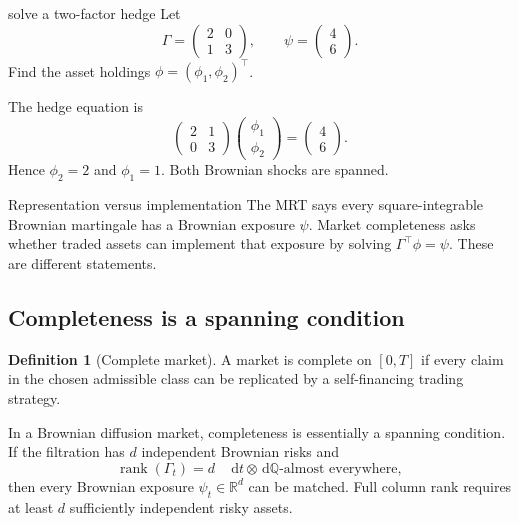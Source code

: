 \documentclass[10pt]{article}
\newcommand{\Q}{\mathbb Q}
\newcommand{\R}{\mathbb R}
\newcommand{\1}{\mathbf 1}
\newcommand{\dd}{\,\mathrm d}
\DeclareMathOperator{\rank}{rank}
\theoremstyle{definition}
\newtheorem{definition}{Definition}[section]
\begin{document}
\begin{studentexercise}{solve a two-factor hedge}
Let
\[
\Gamma=
\begin{pmatrix}
2&0\\
1&3
\end{pmatrix},
\qquad
\psi=
\begin{pmatrix}
4\\6
\end{pmatrix}.
\]
Find the asset holdings \(\phi=(\phi_1,\phi_2)^\top\).
\end{studentexercise}
\begin{shortsolution}
The hedge equation is
\[
\begin{pmatrix}2&1\\0&3\end{pmatrix}
\begin{pmatrix}\phi_1\\\phi_2\end{pmatrix}
=
\begin{pmatrix}4\\6\end{pmatrix}.
\]
Hence \(\phi_2=2\) and \(\phi_1=1\). Both Brownian shocks are spanned.
\end{shortsolution}

\begin{keyidea}{Representation versus implementation}
The MRT says every square-integrable Brownian martingale has a Brownian
exposure \(\psi\). Market completeness asks whether traded assets can
implement that exposure by solving \(\Gamma^\top\phi=\psi\). These are
different statements.
\end{keyidea}

\subsection{Completeness is a spanning condition}

\begin{definition}[Complete market]
A market is complete on \([0,T]\) if every claim in the chosen admissible
class can be replicated by a self-financing trading strategy.
\end{definition}

In a Brownian diffusion market, completeness is essentially a spanning
condition. If the filtration has \(d\) independent Brownian risks and
\[
\rank(\Gamma_t)=d
\quad
\dd t\otimes\dd\Q\text{-almost everywhere},
\]
then every Brownian exposure \(\psi_t\in\R^d\) can be matched. Full column
rank requires at least \(d\) sufficiently independent risky assets.
\end{document}
